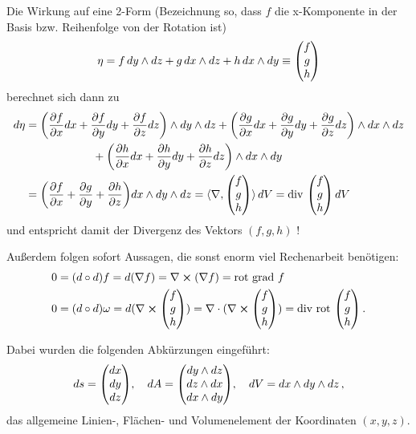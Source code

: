 \documentclass[../H_Analysis_main.tex]{subfiles}
\begin{document}
\begin{bsp}
Die Wirkung auf eine 2-Form (Bezeichnung so, dass $f$ die x-Komponente in der Basis bzw. Reihenfolge von der Rotation ist)
\begin{equation*}
\eta = f \, dy \wedge dz + g \, dx \wedge dz + h \, dx \wedge dy \equiv \mqty(f \\ g \\ h)
\end{equation*}
berechnet sich dann zu
\begin{align}
d\eta &= \qty(\pdv{f}{x} dx + \pdv{f}{y} dy + \pdv{f}{z} dz) \wedge dy \wedge dz + \qty(\pdv{g}{x} dx + \pdv{g}{y} dy + \pdv{g}{z} dz) \wedge dx \wedge dz
\notag\\
& \qquad \qquad \qquad + \qty(\pdv{h}{x} dx + \pdv{h}{y} dy + \pdv{h}{z} dz) \wedge dx \wedge dy
\notag\\
&= \qty(\pdv{f}{x} + \pdv{g}{y} + \pdv{h}{z}) dx \wedge dy \wedge dz = \langle \nabla, \mqty(f \\ g \\ h) \rangle \, dV = \text{div } \mqty(f \\ g \\ h) \, dV
\end{align}
und entspricht damit der Divergenz des Vektors $(f, g, h)$ !


Außerdem folgen sofort Aussagen, die sonst enorm viel Rechenarbeit benötigen:
\begin{align}
0 &= \qty(d \circ d) f = d \qty(\nabla f) = \nabla \cross \qty(\nabla f) = \text{rot grad } f
\\
0 &= \qty(d \circ d) \omega = d (\nabla \cross \mqty(f \\ g \\ h)) = \nabla \cdot (\nabla \cross \mqty(f \\ g \\ h)) = \text{div rot } \mqty(f \\ g \\ h) \, .
\end{align}

Dabei wurden die folgenden Abkürzungen eingeführt:
\begin{equation}
ds = \mqty(dx \\ dy \\ dz), \quad dA = \mqty(dy \wedge dz \\ dz \wedge dx \\ dx \wedge dy), \quad dV = dx \wedge dy \wedge dz \, ,
\end{equation}
das allgemeine Linien-, Flächen- und Volumenelement der Koordinaten $(x, y, z)$.

\end{bsp}
\end{document}
